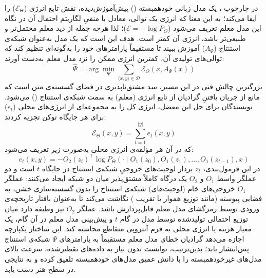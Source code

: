 در چارچوب ، یک مدل زبانی خودهمبسته () پیش‌آموزش‌دیده، نقش تابع انرژی ($\mathcal{E}_\Theta$) را ایفا می‌کند؛ به این معنا که انرژی یک توالی، معادل با منفیِ لگاریتم احتمال آن در نگاه این مدل معلم تعریف می‌شود ($\mathcal{E} = -\log P_\Theta$)؛ لذا هرچه جمله از دید معلم محتمل‌تر و طبیعی‌تر باشد، انرژی آن کمتر است. هدف این است که یک مدل  به‌عنوان شبکه‌ی استنتاج ($A_\Psi$) آموزش ببیند تا مستقیماً پارامترهای خود را به‌گونه‌ای تنظیم کند که توالی‌های تولیدی آن، کمترین انرژی ممکن را نزد مدل معلم به‌دست آورند:
\begin{equation}\label{eq:chap3_engine_inference}
    \hat{\Psi} = \arg\min_\Psi \sum_{\langle x,y \rangle \in \mathcal{D}} \mathcal{E}_\Theta(x, A_\Psi(x))
\end{equation}
بزرگترین چالش فنی در این مسیر، سد مشتق‌ناپذیری در فضای گسسته‌ی متن است که مانع از جریان یافتنِ گرادیان از تابع انرژی (معلم) به سمت شبکه‌ی استنتاج () می‌شود. نویسندگان برای حل این معضل، انرژی کل را به مجموعه‌ای از انرژی‌های محلی ($e_t$) برای هر جایگاه توکن تجزیه کردند:
\begin{equation}\label{eq:chap3_engine_energy}
    \mathcal{E}_\Theta(x,y) = \sum_{t=1}^{|y|} e_t(x,y)
\end{equation}
که در آن هر مؤلفه‌ی انرژی محلی به‌صورت زیر تعریف می‌شود:
\begin{equation}\label{eq:chap3_engine_local_energy}
    e_t(x, y) = - O_2{(z_t)}^\top \log P_\Theta(\cdot \mid O_1(z_0), O_1(z_1), \dots, O_1(z_{t-1}), x)
\end{equation}
در این فرمول‌بندی، $z_t$ بردار لوجیت‌های خروجیِ شبکه‌ی استنتاج در جایگاه $t$ است و دو عملگر واسط $O_1$ و $O_2$ یک درگاه کاملاً مشتق‌پذیر میان دو شبکه ایجاد می‌کنند:
عملگر $O_1$ خروجی‌های خام (لوجیت‌های) شبکه‌ی استنتاج را بدون گسسته‌سازی خشن، به فضایی پیوسته (مانند توزیع هموار  یا تقریب ) نگاشت می‌کند تا به‌عنوان بافتار تاریخچه‌ی ورودی توسط رمزگشای مدل معلم قابل‌پردازش باشد.
عملگر $O_2$ نیز وظیفه دارد میان توزیع احتمالی تولیدشده توسط مدل  در گام $t$ و پیش‌بینی مدل معلم در آن گام، یک معیار هزینه یا انرژی محلی به فرم آنتروپی متقاطع محاسبه کند.
این ساختار یکپارچه اجازه می‌دهد گرادیان خطای مدل معلم مستقیماً به پارامترهای $\Psi$ شبکه‌ی استنتاج پس‌انتشار یابد؛ بدین‌ترتیب،  توانست بدون نیاز به داده‌های تقطیرشده، سرعت بالای مدل‌های غیرخودهمبسته را با دانش عمیق مدل‌های خودهمبسته تلفیق کرده و به نتایجی در سطح هنر دست یابد.

